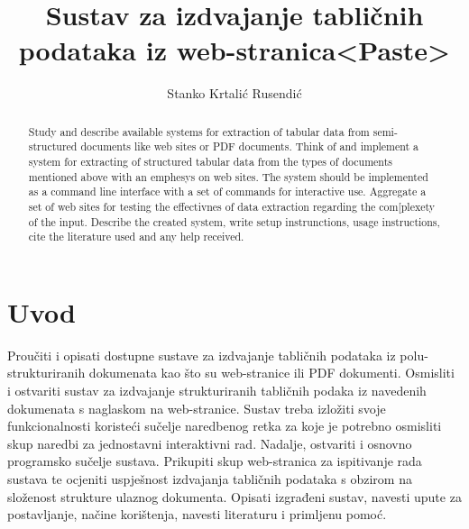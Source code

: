 \documentclass[times, utf8, zavrsni]{fer}
\begin{document}

\title{Sustav za izdvajanje tabličnih podataka iz web-stranica<Paste>}

\author{Stanko Krtalić Rusendić}

\maketitle

\zahvala{}

\tableofcontents

\chapter{Uvod}




\begin{sazetak}
Proučiti i opisati dostupne sustave za izdvajanje tabličnih podataka iz
polu-strukturiranih dokumenata kao što su web-stranice ili PDF dokumenti.
Osmisliti i ostvariti sustav za izdvajanje strukturiranih tabličnih podaka iz
navedenih dokumenata s naglaskom na web-stranice.
Sustav treba izložiti svoje funkcionalnosti koristeći sučelje naredbenog retka
za koje je potrebno osmisliti skup naredbi za jednostavni interaktivni rad.
Nadalje, ostvariti i osnovno programsko sučelje sustava. Prikupiti skup
web-stranica za ispitivanje rada sustava te ocjeniti uspješnost izdvajanja
tabličnih podataka s obzirom na složenost strukture ulaznog dokumenta. Opisati
izgrađeni sustav, navesti upute za postavljanje, načine korištenja, navesti
literaturu i primljenu pomoć.

\kljucnerijeci{}
\end{sazetak}

\begin{abstract}
Study and describe available systems for extraction of tabular data from
semi-structured documents like web sites or PDF documents. Think of and
implement a system for extracting of structured tabular data from the types of
documents mentioned above with an emphesys on web sites.
The system should be implemented as a command line interface with a set of
commands for interactive use. Aggregate a set of web sites for testing the
effectivnes of data extraction regarding the com[plexety of the input.
Describe the created system, write setup instrunctions, usage instructions,
cite the literature used and any help received.

\keywords{}
\end{abstract}
\end{document}
